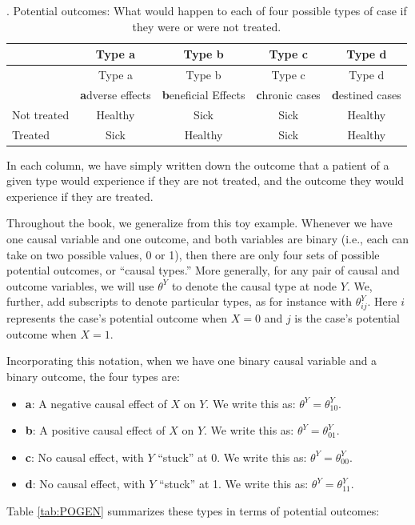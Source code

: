 \documentclass[
  12pt,
]{book}
\providecommand{\tightlist}{%
  \setlength{\itemsep}{0pt}\setlength{\parskip}{0pt}}
\begin{document}
\begin{longtable}[]{@{}lcccc@{}}
\caption{\label{tab:PO}. Potential outcomes: What would happen to each of four possible types of case if they were or were not treated.}\tabularnewline
\toprule
\small & Type a & Type b & Type c & Type d\tabularnewline
\midrule
\endfirsthead
\toprule
\small & Type a & Type b & Type c & Type d\tabularnewline
\midrule
\endhead
& \textbf{a}dverse effects & \textbf{b}eneficial Effects & \textbf{c}hronic cases & \textbf{d}estined cases\tabularnewline
Not treated & Healthy & Sick & Sick & Healthy\tabularnewline
Treated & Sick & Healthy & Sick & Healthy\tabularnewline
\bottomrule
\end{longtable}

In each column, we have simply written down the outcome that a patient of a given type would experience if they are not treated, and the outcome they would experience if they are treated.

Throughout the book, we generalize from this toy example. Whenever we have one causal variable and one outcome, and both variables are binary (i.e., each can take on two possible values, 0 or 1), then there are only four sets of possible potential outcomes, or ``causal types.'' More generally, for any pair of causal and outcome variables, we will use \(\theta^Y\) to denote the causal type at node \(Y\). We, further, add subscripts to denote particular types, as for instance with \(\theta^Y_{ij}\). Here \(i\) represents the case's potential outcome when \(X=0\) and \(j\) is the case's potential outcome when \(X=1\).

Incorporating this notation, when we have one binary causal variable and a binary outcome, the four types are:

\begin{itemize}
\tightlist
\item
  \textbf{a}: A negative causal effect of \(X\) on \(Y\). We write this as: \(\theta^Y = \theta^Y_{10}\).
\item
  \textbf{b}: A positive causal effect of \(X\) on \(Y\). We write this as: \(\theta^Y = \theta^Y_{01}\).
\item
  \textbf{c}: No causal effect, with \(Y\) ``stuck'' at 0. We write this as: \(\theta^Y = \theta^Y_{00}\).
\item
  \textbf{d}: No causal effect, with \(Y\) ``stuck'' at 1. We write this as: \(\theta^Y = \theta^Y_{11}\).
\end{itemize}

Table \ref{tab:POGEN} summarizes these types in terms of potential outcomes:
\end{document}
